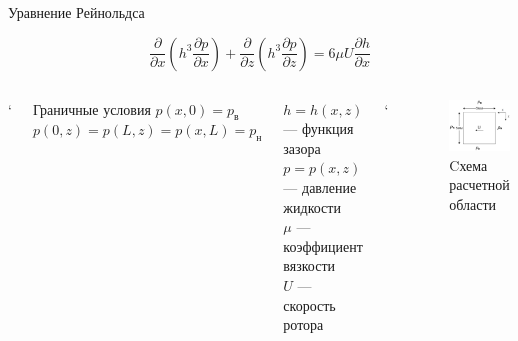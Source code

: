 \documentclass[ignoreonframetext,unicode]{beamer}
\begin{document}
	\begin{frame}{Уравнение Рейнольдса}
		
		\begin{block}{}
			\[
			\frac{\partial}{\partial x} \left(h^3 \frac{\partial p}{\partial x} \right) + \frac{\partial}{\partial z} \left(h^3 \frac{\partial p}{\partial z} \right) = 6 \mu U \frac{\partial h}{\partial x}
			\]
		\end{block}
		
		\vspace*{-10mm}
		\begin{columns}
	
		`
			\begin{block}{Граничные условия}
				$p(x, 0) = p_{\text{в}}$\\ 
				$p(0, z) = p(L, z) = p(x, L) = p_{\text{н}}$
			\end{block}
			\begin{block}{}
			$h = h(x, z)$ --- функция зазора \\
			$p = p(x, z)$ --- давление жидкости \\
			$\mu$ --- коэффициент вязкости \\
			$U$ --- скорость ротора
			\end{block}

	
	`
	\begin{figure}[!htbp]
	\centering
	\includegraphics[width=1\textwidth, height=0.5\textheight]{taskGU}%
	\caption{Cхема расчетной области}
	\vspace*{-2mm}
	\label{ser_graph}
\end{figure}

		\end{columns}
		
		
		
	\end{frame}	
\end{document}

